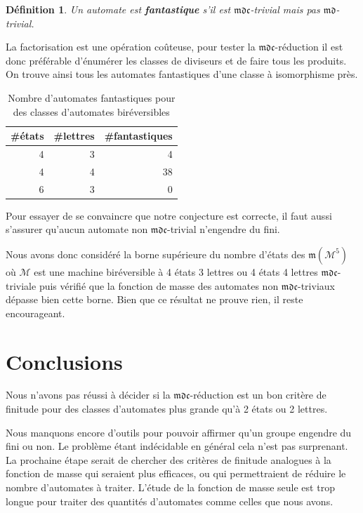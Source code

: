 \documentclass[11pt,a4paper]{article}
\newtheorem{definition}{Définition}
\begin{document}
\begin{definition}
  Un automate est \textbf{\textit{fantastique}} s'il est $\mathfrak{mdc}$-trivial mais pas $\mathfrak{md}$-trivial.
\end{definition}

La factorisation est une opération coûteuse, pour tester la $\mathfrak{mdc}$-réduction il est donc préférable d'énumérer les classes de diviseurs et de faire tous les produits. On trouve ainsi tous les automates fantastiques d'une classe à isomorphisme près.

\begin{table}[h!]
  \begin{center}
    \begin{threeparttable}
      \begin{tabular}{|rrr|}
        \hline
        \#états & \#lettres & \#fantastiques \\ [0.5ex]
        \hline\hline
        \hline
        4 & 3 & 4 \\
        \hline
        4 & 4 & 38 \\
        \hline
        6 & 3 & 0 \\
        \hline
      \end{tabular}
      \caption{Nombre d'automates fantastiques pour des classes d'automates biréversibles}
    \end{threeparttable}
  \end{center}
\end{table}


Pour essayer de se convaincre que notre conjecture est correcte, il faut aussi s'assurer qu'aucun automate non $\mathfrak{mdc}$-trivial n'engendre du fini.

Nous avons donc considéré la borne supérieure du nombre d'états des $\mathfrak{m}(\mathcal{M}^5)$ où $\mathcal{M}$ est une machine biréversible à 4 états 3 lettres ou 4 états 4 lettres $\mathfrak{mdc}$-triviale puis vérifié que la fonction de masse des automates non $\mathfrak{mdc}$-triviaux dépasse bien cette borne. Bien que ce résultat ne prouve rien, il reste encourageant.


\section{Conclusions}

Nous n'avons pas réussi à décider si la $\mathfrak{mdc}$-réduction est un bon critère de finitude pour des classes d'automates plus grande qu'à 2 états ou 2 lettres.

Nous manquons encore d’outils pour pouvoir affirmer qu’un groupe engendre du fini ou non. Le problème étant indécidable en général cela n’est pas surprenant. La prochaine étape serait de chercher des critères de finitude analogues à la fonction de masse qui seraient plus efficaces, ou qui permettraient de réduire le nombre d'automates à traiter. L’étude de la fonction de masse seule est trop longue pour traiter des quantités d’automates comme celles que nous avons.

\newpage
{
  \nocite{*}
}

\end{document}
